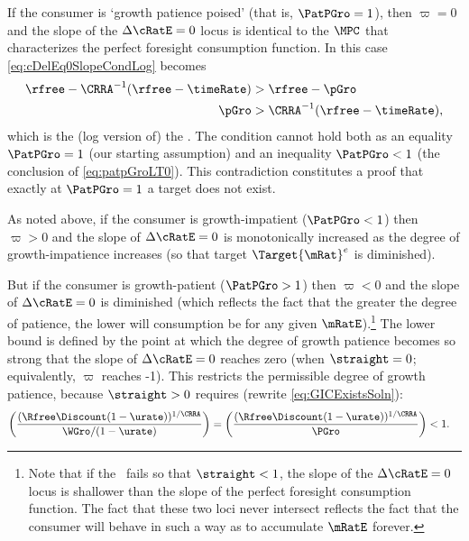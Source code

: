 \documentclass{\handout}
\begin{document}
If the consumer is `growth patience poised' (that is, $\PatPGro = 1$), then $\varpi = 0$ and the slope of the $\dcEqZero$ locus is identical to the $\MPCU$ that characterizes the perfect foresight consumption function.  In this case \eqref{eq:cDelEq0SlopeCondLog} becomes
\begin{equation}\begin{gathered}\begin{aligned}
  \rfree-\CRRA^{-1}(\rfree-\timeRate) & >   \rfree-\pGro
\\ \pGro & >  \CRRA^{-1}(\rfree-\timeRate) \label{eq:patpGroLT0}
,\end{aligned}\end{gathered}\end{equation}
which is the (log version of) the \GICPGro.  The condition cannot hold both as an equality $\PatPGro=1$ (our starting assumption) and an inequality $\PatPGro < 1$ (the conclusion of \eqref{eq:patpGroLT0}).  This contradiction constitutes a proof that exactly at $\PatPGro=1$ a target does not exist.


As noted above, if the consumer is growth-impatient ($\PatPGro < 1$) then $\varpi > 0$ and the slope of $\dcEqZero$ is monotonically increased as the degree of growth-impatience increases (so that target $\Target{\mRat}^{e}$ is diminished).  

But if the consumer is growth-patient ($\PatPGro > 1$) then $\varpi < 0$ and the slope of $\dcEqZero$ is diminished (which reflects the fact that the greater the degree of patience, the lower will consumption be for any given $\mRatE$).\footnote{Note that if the \GICPGro~fails so that $\straight < 1$, the slope of the $\dcEqZero$ locus is shallower than the slope of the perfect foresight consumption function.  The fact that these two loci never intersect reflects the fact that the consumer will behave in such a way as to accumulate $\mRatE$ forever.}  The lower bound is defined by the point at which the degree of growth patience becomes so strong that the slope of $\dcEqZero$ reaches zero (when $\straight=0$; equivalently, $\varpi$ reaches -1).  This restricts the permissible degree of growth patience, because $\straight > 0$ requires (rewrite \eqref{eq:GICExistsSoln}):
\begin{equation}\begin{gathered}\begin{aligned}
  \left(\frac{(\Rfree \Discount (1-\urate))^{1/\CRRA}}{\WGro/(1-\urate)}\right) = \left(\frac{(\Rfree \Discount (1-\urate))^{1/\CRRA}}{\PGro}\right) & <  1
.\end{aligned}\end{gathered}\end{equation}
\end{document}
